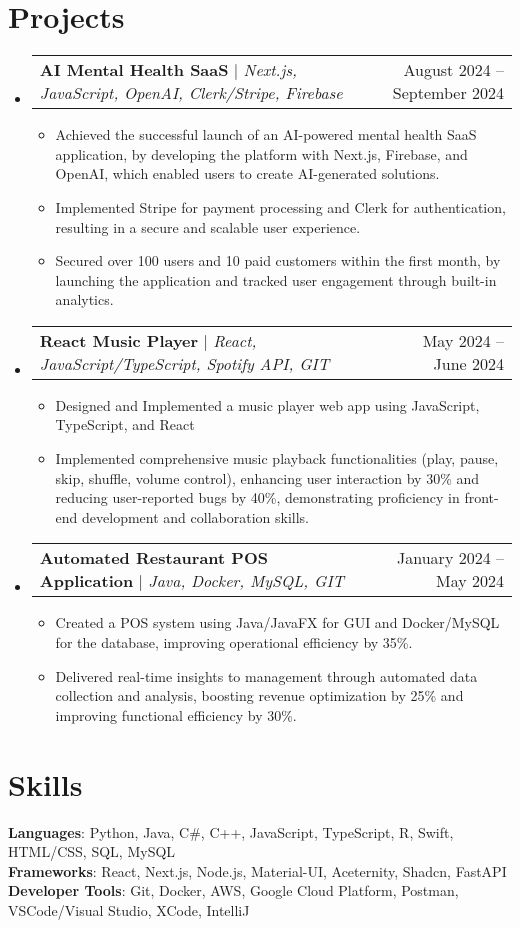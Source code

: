 \documentclass[letterpaper,11pt]{article}
\makeatletter
\newcommand{\resumeItem}[1]{
  \item\small{
    {#1 \vspace{-1pt}}
  }
}
\newcommand{\resumeProjectHeading}[2]{
    \item
    \begin{tabular*}{0.97\textwidth}{l@{\extracolsep{\fill}}r}
      \small#1 & #2 \\
    \end{tabular*}\vspace{-6pt}
}
\newcommand{\resumeSubHeadingListStart}{\begin{itemize}[leftmargin=0.15in, label={}]}
\newcommand{\resumeSubHeadingListEnd}{\end{itemize}}
\newcommand{\resumeItemListStart}{\begin{itemize}}
\newcommand{\resumeItemListEnd}{\end{itemize}\vspace{-5pt}}
\makeatother
\begin{document}
\section{Projects}
    \resumeSubHeadingListStart
      \resumeProjectHeading
          {\textbf{AI Mental Health SaaS} $|$ \emph{Next.js, JavaScript, OpenAI, Clerk/Stripe, Firebase}}{August 2024 -- September 2024}
          \resumeItemListStart
            \resumeItem{Achieved the successful launch of an AI-powered mental health SaaS application, by developing the platform with Next.js, Firebase, and OpenAI, which enabled users to create AI-generated solutions.}
            \resumeItem{Implemented Stripe for payment processing and Clerk for authentication, resulting in a secure and scalable user experience.}
            \resumeItem{Secured over 100 users and 10 paid customers within the first month, by launching the application and tracked user engagement through built-in analytics.}
          \resumeItemListEnd
      \resumeProjectHeading
          {\textbf{React Music Player} $|$ \emph{React, JavaScript/TypeScript, Spotify API, GIT}}{May 2024 -- June 2024}
          \resumeItemListStart
            \resumeItem{Designed and Implemented a music player web app using JavaScript, TypeScript, and React}
            \resumeItem{Implemented comprehensive music playback functionalities (play, pause, skip, shuffle, volume control), enhancing user interaction by 30\% and reducing user-reported bugs by 40\%, demonstrating proficiency in front-end development and collaboration skills.}
          \resumeItemListEnd
        \resumeProjectHeading
          {\textbf{Automated Restaurant POS Application} $|$ \emph{Java, Docker, MySQL, GIT}}{January 2024 -- May 2024}
          \resumeItemListStart
            \resumeItem{Created a POS system using Java/JavaFX for GUI and Docker/MySQL for the database, improving operational efficiency by 35\%.}
            \resumeItem{Delivered real-time insights to management through automated data collection and analysis, boosting revenue optimization by 25\% and improving functional efficiency by 30\%.}
          \resumeItemListEnd
    \resumeSubHeadingListEnd



%
\section{Skills}
 \begin{itemize}[leftmargin=0.15in, label={}]
    \small{\item{
     \textbf{Languages}{: Python, Java, C\#, C++, JavaScript, TypeScript, R, Swift, HTML/CSS, SQL, MySQL} \\
     \textbf{Frameworks}{: React, Next.js, Node.js, Material-UI, Aceternity, Shadcn, FastAPI} \\
     \textbf{Developer Tools}{: Git, Docker, AWS, Google Cloud Platform, Postman, VSCode/Visual Studio, XCode, IntelliJ} \\
    }}
 \end{itemize}


\end{document}
